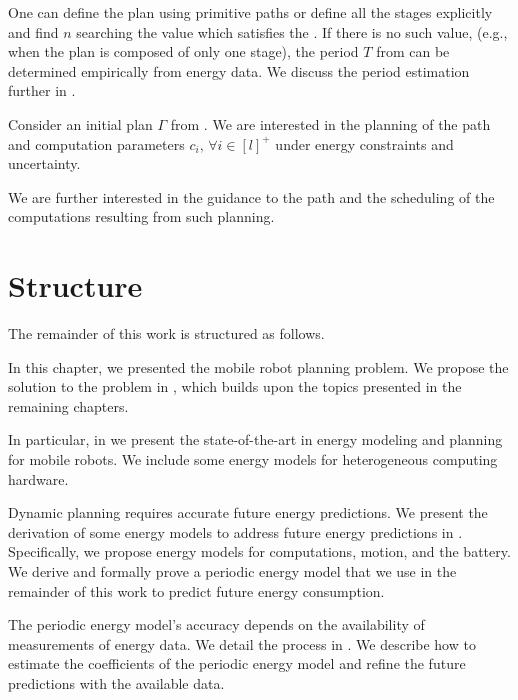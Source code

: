 One can define the plan using primitive paths or define all the stages explicitly and find $n$ searching the value which satisfies the . If there is no such value, (e.g., when the plan is composed of only one stage), the period $T$ from  can be determined empirically from energy data. We discuss the period estimation further in .

\begin{highlight}
\begin{pb}\label{pb}
  Consider an initial plan $\Gamma$ from . We are interested in the planning of the path and computation parameters $c_i,\,\forall i\in[l]^+$ under energy constraints and uncertainty.
  
We are further interested in the guidance to the path and the scheduling of the computations resulting from such planning.
\end{pb}    
\end{highlight}

\section{Structure}
\label{sec:structure}

The remainder of this work is structured as follows.

In this chapter, we presented the mobile robot planning problem. We propose the solution to the problem in , which builds upon the topics presented in the remaining chapters.

In particular, in  we present the state-of-the-art in energy modeling and planning for mobile robots. We include some energy models for heterogeneous computing hardware.

Dynamic planning requires accurate future energy predictions. We present the derivation of some energy models to address future energy predictions in . Specifically, we propose energy models for computations, motion, and the battery. We derive and formally prove a periodic energy model that we use in the remainder of this work to predict future energy consumption.

The periodic energy model's accuracy depends on the availability of measurements of energy data. We detail the process in . We describe how to estimate the coefficients of the periodic energy model and refine the future predictions with the available data.

